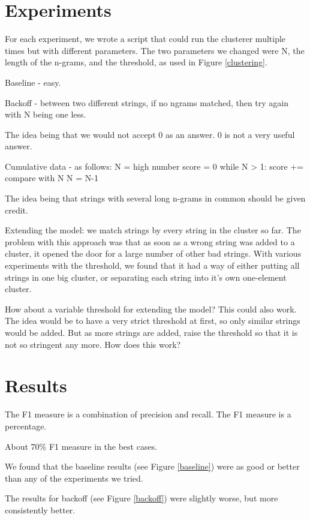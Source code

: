 \documentclass{article}
\begin{document}
\section{Experiments}
For each experiment, we wrote a script that could run the clusterer multiple times but with different parameters. The two parameters we changed were N, the length of the n-grams, and the threshold, as used in Figure \ref{clustering}.




Baseline - easy.

Backoff - between two different strings, if no ngrams matched, then try again 
with N being one less.

The idea being that we would not accept 0 as an answer. 0 is not a very useful answer.

Cumulative data - as follows:
N = high number
score = 0
while N > 1:
	score += compare with N
 	N = N-1 

The idea being that strings with several long n-grams in common should be given credit. 


Extending the model: we match strings by every string in the cluster so far. 
The problem with this approach was that as soon as a wrong string was added to a cluster, it opened the door for a large number of other bad strings. With various experiments with the threshold, we found that it had a way of either putting all strings in one big cluster, or separating each string into it's own one-element cluster. 

How about a variable threshold for extending the model? This could also work. The idea would be to have a very strict threshold at first, so only similar strings would be added. But as more strings are added, raise the threshold so that it is not so stringent any more. How does this work?





\section{Results}
The F1 measure is a combination of precision and recall. The F1 measure is a percentage. 

About 70\% F1 measure in the best cases.

We found that the baseline results (see Figure \ref{baseline}) were as good or better than any of the experiments we tried.

The results for backoff (see Figure \ref{backoff}) were slightly worse, but more consistently better.
\end{document}
